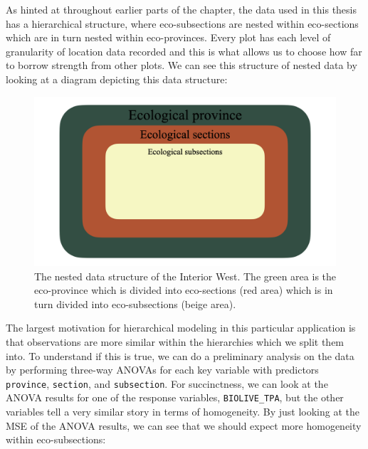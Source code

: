 \documentclass[12pt,twoside]{reedthesis}
\begin{document}
As hinted at throughout earlier parts of the chapter, the data used in this thesis has a hierarchical structure, where eco-subsections are nested within eco-sections which are in turn nested within eco-provinces. Every plot has each level of granularity of location data recorded and this is what allows us to choose how far to borrow strength from other plots. We can see this structure of nested data by looking at a diagram depicting this data structure:
\begin{figure}

{\centering \includegraphics[width=1\linewidth]{figure/data-structure} 

}

\caption[The nested data structure of the Interior West]{The nested data structure of the Interior West. The green area is the eco-province which is divided into eco-sections (red area) which is in turn divided into eco-subsections (beige area).}\label{fig:unnamed-chunk-12}
\end{figure}
The largest motivation for hierarchical modeling in this particular application is that observations are more similar within the hierarchies which we split them into. To understand if this is true, we can do a preliminary analysis on the data by performing three-way ANOVAs for each key variable with predictors \texttt{province}, \texttt{section}, and \texttt{subsection}. For succinctness, we can look at the ANOVA results for one of the response variables, \texttt{BIOLIVE\_TPA}, but the other variables tell a very similar story in terms of homogeneity. By just looking at the MSE of the ANOVA results, we can see that we should expect more homogeneity within eco-subsections:
\end{document}
